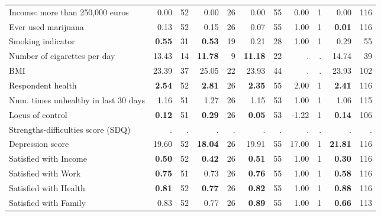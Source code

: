\begin{tabular}{l r r r r r r r r r r}
Income: more than 250,000 euros &      0.00 &        52 &      0.00 &        26 &      0.00 &        55 &      0.00 &         1 &      0.00 &       116 \\
Ever used marijuana &      0.13 &        52 &      0.15 &        26 &      0.07 &        55 &      1.00 &         1 & \textbf{     0.01} &       116 \\
Smoking indicator & \textbf{     0.55} &        31 & \textbf{     0.53} &        19 &      0.21 &        28 &      1.00 &         1 &      0.29 &        55 \\
Number of cigarettes per day &     13.43 &        14 & \textbf{    11.78} &         9 & \textbf{    11.18} &        22 &         . & . &     14.74 &        39 \\
BMI &     23.39 &        37 &     25.05 &        22 &     23.93 &        44 &         . & . &     23.93 &       102 \\
Respondent health & \textbf{     2.54} &        52 & \textbf{     2.81} &        26 & \textbf{     2.35} &        55 &      2.00 &         1 & \textbf{     2.41} &       116 \\
Num. times unhealthy in last 30 days &      1.16 &        51 &      1.27 &        26 &      1.15 &        53 &      1.00 &         1 &      1.06 &       115 \\
Locus of control & \textbf{     0.12} &        51 & \textbf{     0.29} &        26 & \textbf{     0.05} &        53 &     -1.22 &         1 & \textbf{     0.14} &       106 \\
Strengths-difficulties score (SDQ) &         . & . &         . & . &         . & . &         . & . &         . & . \\
Depression score &     19.60 &        52 & \textbf{    18.04} &        26 &     19.91 &        55 &     17.00 &         1 & \textbf{    21.81} &       116 \\
Satisfied with Income & \textbf{     0.50} &        52 & \textbf{     0.42} &        26 & \textbf{     0.51} &        55 &      1.00 &         1 & \textbf{     0.30} &       116 \\
Satisfied with Work & \textbf{     0.75} &        51 &      0.73 &        26 & \textbf{     0.76} &        55 &      1.00 &         1 & \textbf{     0.58} &       116 \\
Satisfied with Health & \textbf{     0.81} &        52 & \textbf{     0.77} &        26 & \textbf{     0.82} &        55 &      1.00 &         1 & \textbf{     0.88} &       116 \\
Satisfied with Family &      0.83 &        52 &      0.77 &        26 & \textbf{     0.89} &        55 &      1.00 &         1 & \textbf{     0.66} &       113 \\
\bottomrule
\end{tabular}
